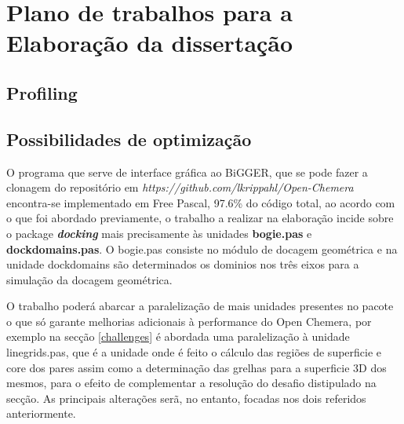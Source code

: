 \chapter{Plano de trabalhos para a Elaboração da dissertação}
\label{cha3}

%
\section {Profiling}

\section{Possibilidades de optimização} %
\label{abordagem}
O programa que serve de interface gráfica ao BiGGER, que se pode fazer a clonagem do repositório em \textit{https://github.com/lkrippahl/Open-Chemera} encontra-se implementado em Free Pascal, 97.6\% do código total, ao acordo com o que foi abordado previamente, o trabalho a realizar na elaboração incide sobre o package \textbf{\textit{docking}} mais precisamente às unidades \textbf{bogie.pas} e \textbf{dockdomains.pas}. O bogie.pas consiste no módulo de docagem geométrica  e na unidade dockdomains são determinados os dominios nos três eixos para a simulação da docagem geométrica.

 O trabalho poderá abarcar a paralelização de mais unidades presentes no pacote o que só garante melhorias adicionais à performance do Open Chemera, por exemplo na secção \ref{challenges} é abordada uma paralelização à unidade linegrids.pas, que é a unidade onde é feito o cálculo das regiões de superficie e core dos pares assim como a determinação das grelhas para a superficie 3D dos mesmos, para o efeito de complementar a resolução do desafio distipulado na secção. As principais alterações serã, no entanto, focadas nos dois referidos anteriormente.
 
